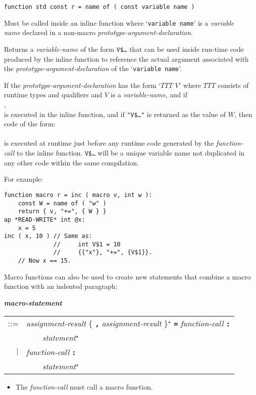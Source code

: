\documentclass[12pt]{article}
\newcommand{\TT}[1]{{\tt \bfseries #1}}
\newcommand{\STAR}{{\Large $^\star$}}
\newcommand{\emkey}[1]{{\em \bfseries #1}}
\newenvironment{indpar}[1][0.3in]%
	{\begin{list}{}%
		     {\setlength{\itemsep}{0in}%
		      \setlength{\topsep}{0in}%
		      \setlength{\parsep}{1ex}%
		      \setlength{\labelwidth}{#1}%
		      \setlength{\leftmargin}{#1}%
		      \addtolength{\leftmargin}{\labelsep}}%
	 \item}%
	{\end{list}}
\begin{document}
{\tt function std const r = name of ( const variable name )}
\begin{indpar}
Must be called inside an inline function 
where `{\tt variable name}' is a {\em variable name}
declared in a non-macro {\em prototype-argument-declaration}.

Returns a {\em variable-name} of the form {\tt V\$\ldots}
that can be used inside run-time code produced by the inline
function to reference the actual argument associated with
the {\em prototype-argument-declaration} of the `{\tt variable name}'.

If the {\em prototype-argument-declaration} has the form `$TTT$ $V$'
where $TTT$ consists of runtime types and qualifiers and $V$ is a
{\em variable-name}, and if \\
\hspace*{1in}{\tt $W$ = name of ( "$V$" )}, \\
is executed in the inline function,
and if {\tt "V\$\ldots"} is returned as the value of $W$,
then code of the form: \\
 \\
is executed at runtime just before any
runtime code generated by the {\em function-call} to the inline function.
{\tt V\$\ldots} will be a unique variable name not duplicated in any other
code within the same compilation.
\end{indpar}

For example:
\begin{indpar}[1em]\begin{verbatim}
function macro r = inc ( macro v, int w ):
    const W = name of ( "w" )
    return { v, "+=", { W } }
ap *READ-WRITE* int @x:
    x = 5
inc ( x, 10 ) // Same as:
              //     int V$1 = 10
              //     {{"x"}, "+=", {V$1}}.
    // Now x == 15.
\end{verbatim}\end{indpar}

Macro functions can also be used to create new statements that
combine a macro function with an indented paragraph:

\begin{indpar}
\emkey{macro-statement}\label{MACRO-STATEMENT} \\
\hspace*{0.5in} \begin{tabular}{rl}
                ::= & {\em assignment-result}
                      \{ \TT{,} {\em assignment-result} \}\STAR{}
		      \TT{=} {\em function-call} \TT{:} \\
		    & \TT{~~~~}{\em statement}\STAR{} \\
		$|$ & {\em function-call} \TT{:} \\
		    & \TT{~~~~}{\em statement}\STAR{} \\
		\end{tabular}
\begin{itemize}
\item The {\em function-call} must call a macro function.
\end{itemize}
\end{indpar}
\end{document}
